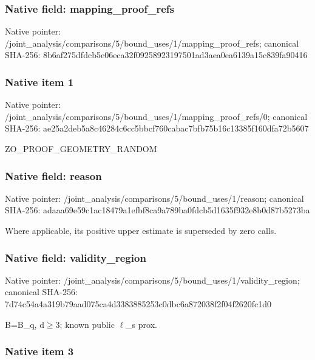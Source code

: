 \documentclass[10pt,a4paper]{article}
\begin{document}
\subsubsection{Native field: mapping\_proof\_refs}


Native pointer: /joint\_analysis/comparis\allowbreak{}ons/5/bound\_uses/1/mappi\allowbreak{}ng\_proof\_refs; canonical SHA-256: 8b6af275dfdcb5e06eca32f0\allowbreak{}9258923197501ad3aea0ea61\allowbreak{}39a15c839fa90416



\subsubsection{Native item 1}


Native pointer: /joint\_analysis/comparis\allowbreak{}ons/5/bound\_uses/1/mappi\allowbreak{}ng\_proof\_refs/0; canonical SHA-256: ae25a2deb5a8c46284c6cc5b\allowbreak{}bcf760cabac7bfb75b16c133\allowbreak{}85f160dfa72b5607


ZO\_PROOF\_GEOMETRY\_RANDOM


\subsubsection{Native field: reason}


Native pointer: /joint\_analysis/comparis\allowbreak{}ons/5/bound\_uses/1/reaso\allowbreak{}n; canonical SHA-256: adaaa69e59c1ac18479a1efb\allowbreak{}f8ca9a789ba0fdcb5d1635f9\allowbreak{}32e8b0d87b5273ba


Where applicable, its positive upper estimate is superseded by zero calls.


\subsubsection{Native field: validity\_region}


Native pointer: /joint\_analysis/comparis\allowbreak{}ons/5/bound\_uses/1/valid\allowbreak{}ity\_region; canonical SHA-256: 7d74c54a4a319b79aad075ca\allowbreak{}4d3383885253c0dbc6a87203\allowbreak{}8f2f04f2620fc1d0


B=B\_q, d\ensuremath{\ge}3; known public \ensuremath{\ell}\_s prox.


\subsubsection{Native item 3}
\end{document}
